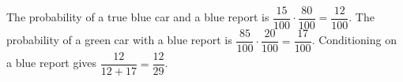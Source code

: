 The probability of a true blue car and a blue report is $\dfrac{15}{100}\cdot\dfrac{80}{100}=\dfrac{12}{100}$. The probability of a green car with a blue report is $\dfrac{85}{100}\cdot\dfrac{20}{100}=\dfrac{17}{100}$. Conditioning on a blue report gives $\dfrac{12}{12+17}=\boxed{\dfrac{12}{29}}$.
